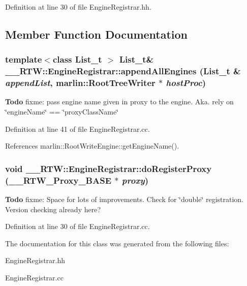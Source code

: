 Definition at line 30 of file EngineRegistrar.hh.

\subsection{Member Function Documentation}
\subsubsection[{appendAllEngines}]{\setlength{\rightskip}{0pt plus 5cm}template$<$class List\_\-t $>$ List\_\-t\& \_\-\_\-RTW::EngineRegistrar::appendAllEngines (List\_\-t \& {\em appendList}, \/  {\bf marlin::RootTreeWriter} $\ast$ {\em hostProc})\hspace{0.3cm}{\ttfamily  [inline]}}\label{class____RTW_1_1EngineRegistrar_aba706118660d2444f715e178390f1edd}


\begin{Desc}
\item[{\bf Todo}]fixme: pass engine name given in proxy to the engine. Aka. rely on \char`\"{}engineName\char`\"{} == \char`\"{}proxyClassName\char`\"{} \end{Desc}


Definition at line 41 of file EngineRegistrar.cc.

References marlin::RootWriteEngine::getEngineName().
\subsubsection[{doRegisterProxy}]{\setlength{\rightskip}{0pt plus 5cm}void \_\-\_\-RTW::EngineRegistrar::doRegisterProxy (\_\-\_\-RTW\_\-Proxy\_\-BASE $\ast$ {\em proxy})\hspace{0.3cm}{\ttfamily  [protected]}}\label{class____RTW_1_1EngineRegistrar_a7671b977b55c9510741744fd3da502d6}


\begin{Desc}
\item[{\bf Todo}]fixme: Space for lots of improvements. Check for \char`\"{}double\char`\"{} registration. Version checking already here?  \end{Desc}


Definition at line 30 of file EngineRegistrar.cc.

The documentation for this class was generated from the following files:\begin{DoxyCompactItemize}
\item 
EngineRegistrar.hh\item 
EngineRegistrar.cc\end{DoxyCompactItemize}
